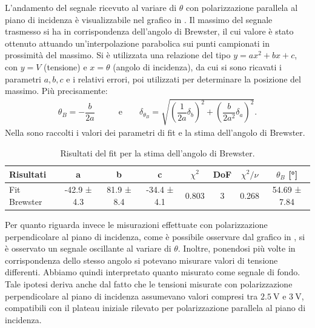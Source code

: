 \documentclass[a4paper]{article}
\begin{document}
L'andamento del segnale ricevuto al variare di $\theta$ con polarizzazione parallela al piano di incidenza è visualizzabile nel grafico in . Il massimo del segnale trasmesso si ha in corrispondenza dell'angolo di Brewster, il cui valore è stato ottenuto attuando un'interpolazione parabolica sui punti campionati in prossimità del massimo. Si è utilizzata una relazione del tipo $y = ax^2 + bx +c$, con $y=V$ (tensione) e $x=\theta$ (angolo di incidenza), da cui si sono ricavati i parametri $a, b, c$ e i relativi errori, poi utilizzati per determinare la posizione del massimo. Più precisamente:
\begin{align}
  \theta_{B} = -\dfrac{b}{2a} \qquad & \text{e}\qquad
  \delta_{\theta_{B}} = \sqrt{\left(\dfrac{1}{2a}\delta_b\right)^2 + \left(\dfrac{b}{2a^2}\delta_a\right)^2}. \label{eq:angolo_brewster_calc}
\end{align}
Nella  sono raccolti i valori dei parametri di fit e la stima dell'angolo di Brewster.
\begin{table}[htbp]
\centering
\begin{tabular}{|l|ccccccc|}
\hline
Risultati & a & b & c & $\chi^2$ & DoF & $\chi^2/\nu$ & $\theta_B$ [\si{\degree}]\\\hline\hline
Fit Brewster & -42.9 ± 4.3 & 81.9 ± 8.4 & -34.4 ± 4.1 & 0.803 & 3 & 0.268 & 54.69 ± 7.84 \\\hline
\end{tabular}
\caption{Risultati del fit per la stima dell'angolo di Brewster.}
\label{tab:fit_brewster}
\end{table}
Per quanto riguarda invece le misurazioni effettuate con polarizzazione perpendicolare al piano di incidenza, come è possibile osservare dal grafico in , si è osservato un segnale oscillante al variare di $\theta$. Inoltre, ponendosi più volte in corrispondenza dello stesso angolo si potevano misurare valori di tensione differenti. Abbiamo quindi interpretato quanto misurato come segnale di fondo. Tale ipotesi deriva anche dal fatto che le tensioni misurate con polarizzazione perpendicolare al piano di incidenza assumevano valori compresi tra $\SI{2.5}{\volt}$ e $\SI{3}{\volt}$, compatibili con il plateau iniziale rilevato per polarizzazione parallela al piano di incidenza.
\end{document}
